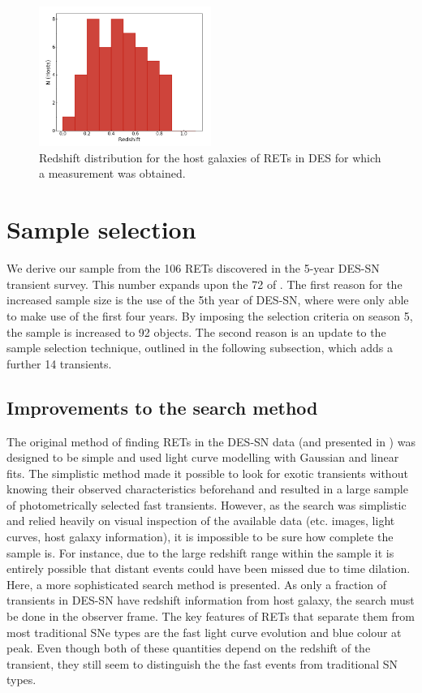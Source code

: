 \documentclass[fleqn,usenatbib,]{mnras}
\newcommand{\replylluis}[1]{\color{brown}#1 \color{black}}
\begin{document}
\begin{figure}
\includegraphics[width=0.5\textwidth]{figs/z_dist.png}
\caption{Redshift distribution for the host galaxies of RETs in DES for which a measurement was obtained.
\label{fig:z_dist}}
\end{figure}

\section{Sample selection}
\label{sec:sample}
We derive our sample from the 106 RETs discovered in the 5-year DES-SN transient survey. This number expands upon the 72 of . The first reason for the increased sample size is the use of the 5th year of DES-SN, where  were only able to make use of the first four years. \replylluis{By imposing the \citetalias{Pursiainen2018} selection criteria on season 5, the sample is increased to 92 objects.} The second reason is an update to the sample selection technique, \replylluis{outlined in the following subsection, which adds a further 14 transients.}

\subsection{Improvements to the search method \label{subsec:new_method}}

The original method of finding RETs in the DES-SN data (and presented in ) was designed to be simple and used light curve modelling with Gaussian and linear fits. The simplistic method made it possible to look for exotic transients without knowing their observed characteristics beforehand and resulted in a large sample of photometrically selected fast transients. However, as the search was simplistic and relied heavily on visual inspection of the available data (etc. images, light curves, host galaxy information), it is impossible to be sure how complete the sample is. For instance, due to the large redshift range within the sample it is entirely possible that distant events could have been missed due to time dilation. Here, a more sophisticated search method is presented. As only a fraction of transients in DES-SN have redshift information from host galaxy, the search must be done in the observer frame.  The key features of RETs that separate them from most traditional SNe types are the fast light curve evolution and blue colour at peak. Even though both of these quantities depend on the redshift of the transient, they still seem to distinguish the the fast events from traditional SN types. 
\end{document}
